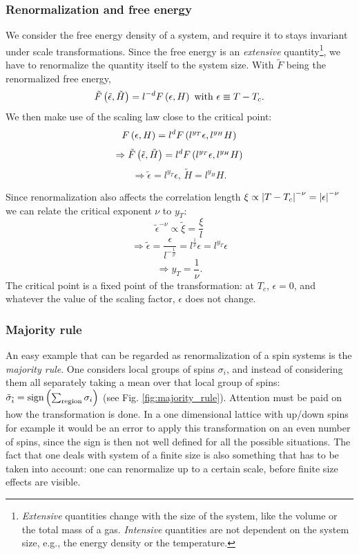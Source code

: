 \subsubsection*{Renormalization and free energy}
We consider the free energy density of a system, and require it to stays invariant under scale transformations. Since the free energy is an \emph{extensive} quantity\footnote{\emph{Extensive} quantities change with the size of the system, like the volume or the total mass of a gas. \emph{Intensive} quantities are not dependent on the system size, e.g., the energy density or the temperature.}, we have to renormalize the quantity itself to the system size. With $\tilde F$ being the renormalized free energy,
\begin{equation}
\tilde{F}\left(\tilde{\epsilon},\tilde{H}\right)=l^{-d} F\left(\epsilon, H\right)\text{ with }\epsilon\equiv T-T_c.
\end{equation}
We then make use of the scaling law close to the critical point:
$$
F\left(\epsilon,H\right) = l^d F\left(l^{y_T}\epsilon, l^{y_H}H\right)
$$
$$
\Rightarrow 
\tilde{F}\left(\tilde{\epsilon},\tilde{H}\right) = l^d F\left(l^{y_T}\epsilon, l^{y_H}H\right)
$$
\begin{equation}
\Rightarrow 
\tilde{\epsilon} = l^{y_T}\epsilon\text{, }\tilde{H} = l^{y_H}H.
\end{equation}

Since renormalization also affects the correlation length $\xi\propto \left|T-T_c\right|^{-\nu}= \left|\epsilon\right|^{-\nu}$ we can relate the critical exponent $\nu$ to $y_T$:
$$
\tilde{\epsilon}^{-\nu}\propto \tilde{\xi} = \frac{\xi}{l}
$$
$$
\Rightarrow
\tilde{\epsilon} =\frac{\epsilon}{l^{-\frac{1}{\nu}}} =l^{\frac{1}{\nu}}\epsilon=l^{y_T}\epsilon
$$
$$
\Rightarrow
y_T=\frac{1}{\nu}.
$$
The critical point is a fixed point of the transformation: at $T_c$, $\epsilon=0$, and whatever the value of the scaling factor, $\epsilon$ does not change.

\subsubsection*{Majority rule}


An easy example that can be regarded as renormalization of a spin systems is the \emph{majority rule}. One considers local groups of spins $\sigma_i$, and instead of considering them all separately taking a mean over that local group of spins: $\tilde{\sigma}_{\tilde{i}} =\text{sign}\left(\sum_{\text{region}}\sigma_i\right)$ (see Fig. \ref{fig:majority_rule}). Attention must be paid on how the transformation is done. In a one dimensional lattice with up/down spins for example it would be an error to apply this transformation on an even number of spins, since the sign is then not well defined for all the possible situations. The fact that one deals with system of a finite size is also something that has to be taken into account: one can renormalize up to a certain scale, before finite size effects are visible.



